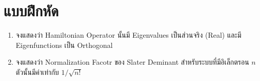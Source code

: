 \section{แบบฝึกหัด}

\begin{enumerate}
    \item จงแสดงว่า Hamiltonian Operator นั้นมี Eigenvalues เป็นส่วนจริง (Real) และมี Eigenfunctions เป็น Orthogonal
    
    \item จงแสดงว่า Normalization Facotr ของ Slater Deminant สำหรับระบบที่มีอิเล็กตรอน $n$ ตัวนั้นมีค่าเท่ากับ $1 / \sqrt{n!}$
\end{enumerate}
